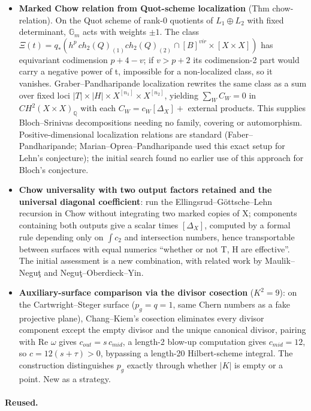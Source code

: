 \documentclass[11pt]{article}
\begin{document}
\begin{itemize}
\item \textbf{Marked Chow relation from Quot-scheme localization} (Thm chow-relation). On the Quot scheme of rank-0 quotients of $L_1\oplus L_2$ with fixed determinant, $\mathbb G_m$ acts with weights $\pm1$. The class $\Xi(t)=q_*(h^p\,ch_2(Q)_{(1)}ch_2(Q)_{(2)}\cap[B]^{vir}\times[X\times X])$ has equivariant codimension $p+4-v$; if $v>p+2$ its codimension-2 part would carry a negative power of t, impossible for a non-localized class, so it vanishes. Graber--Pandharipande localization rewrites the same class as a sum over fixed loci $|T|\times|H|\times X^{[n_1]}\times X^{[n_2]}$, yielding $\sum_WC_W=0$ in $CH^2(X\times X)_{\mathbb Q}$ with each $C_W=c_W[\Delta_X]+$ external products. This supplies Bloch--Srinivas decompositions needing no family, covering or automorphism. Positive-dimensional localization relations are standard (Faber--Pandharipande; Marian--Oprea--Pandharipande used this exact setup for Lehn's conjecture); the initial search found no earlier use of this approach for Bloch's conjecture.
\item \textbf{Chow universality with two output factors retained and the universal diagonal coefficient}: run the Ellingsrud--Göttsche--Lehn recursion in Chow without integrating two marked copies of X; components containing both outputs give a scalar times $[\Delta_X]$, computed by a formal rule depending only on $\int c_2$ and intersection numbers, hence transportable between surfaces with equal numerics ``whether or not T, H are effective''. The initial assessment is a new combination, with related work by Maulik--Negu\c{t} and Negu\c{t}--Oberdieck--Yin.
\item \textbf{Auxiliary-surface comparison via the divisor cosection} ($K^{2}=9$): on the Cartwright--Steger surface ($p_g=q=1$, same Chern numbers as a fake projective plane), Chang--Kiem's cosection eliminates every divisor component except the empty divisor and the unique canonical divisor, pairing with Re $\omega$ gives $c_{out}=s\,c_{mid}$, a length-2 blow-up computation gives $c_{mid}=12$, so $c=12(s+\tau)>0$, bypassing a length-20 Hilbert-scheme integral. The construction distinguishes $p_g$ exactly through whether $|K|$ is empty or a point. New as a strategy.
\end{itemize}

\paragraph{Reused.}
\end{document}
